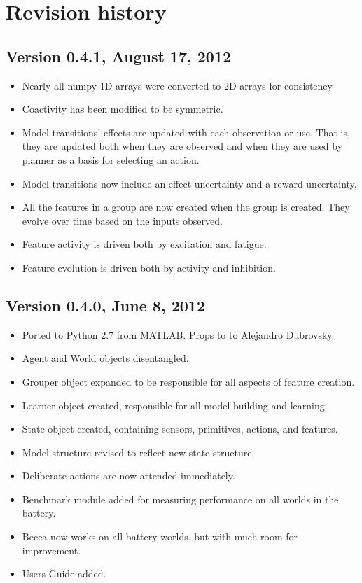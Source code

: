\chapter{Revision history}

\section{Version 0.4.1, August 17, 2012}

\begin{itemize}
\item Nearly all numpy 1D arrays were converted to 2D arrays for consistency   
\item Coactivity has been modified to be symmetric.
\item Model transitions' effects are updated with each observation or use. That is, they are updated both when they are observed and when they are used by planner as a basis for selecting an action.
\item Model transitions now include an effect uncertainty and a reward uncertainty. 
\item All the features in a group are now created when the group is created. They evolve over time based on the inputs observed.
\item Feature activity is driven both by excitation and fatigue.
\item Feature evolution is driven both by activity and inhibition.
\end{itemize}


\section{Version 0.4.0, June 8, 2012}

\begin{itemize}
\item Ported to Python 2.7 from MATLAB. Props to to Alejandro Dubrovsky.
\item Agent and World objects disentangled.
\item Grouper object expanded to be responsible for all aspects of feature creation.
\item Learner object created, responsible for all model building and learning.
\item State object created, containing sensors, primitives, actions, and features.
\item Model structure revised to reflect new state structure.
\item Deliberate actions are now attended immediately.
\item Benchmark module added for measuring performance on all worlds in the battery.
\item Becca now works on all battery worlds, but with much room for improvement.
\item Users Guide added. 
\end{itemize}

